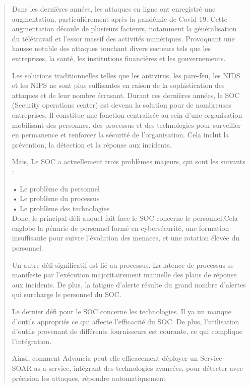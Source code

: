 \documentclass[
]{article}
\begin{document}
\begin{quote}
Dans les dernières années, les attaques en ligne ont enregistré une
augmentation, particulièrement après la pandémie de Covid-19. Cette
augmentation découle de plusieurs facteurs, notamment la généralisation
du télétravail et l'essor massif des activités numériques. Provoquant
une hausse notable des attaques touchant divers secteurs tels que les
entreprises, la santé, les institutions financières et les
gouvernements.

Les solutions traditionnelles telles que les antivirus, les pare-feu,
les NIDS et les NIPS ne sont plus suffisantes en raison de la
sophistication des attaques et de leur nombre écrasant. Durant ces
dernières années, le SOC (Security operations center) est devenu la
solution pour de nombreuses entreprises. Il constitue une fonction
centralisée au sein d'une organisation mobilisant des personnes, des
processus et des technologies pour surveiller en permanence et renforcer
la sécurité de l'organisation. Cela inclut la prévention, la détection
et la réponse aux incidents.

Mais, Le SOC a actuellement trois problèmes majeurs, qui sont les
suivants :

\emph{•} Le problème du personnel\\
\emph{•} Le problème du processus\\
\emph{•} Le problème des technologies\\
Donc, le principal défi auquel fait face le SOC concerne le
personnel.Cela englobe la pénurie de personnel formé en cybersécurité,
une formation insuffisante pour suivre l'évolution des menaces, et une
rotation élevée du personnel.

Un autre défi significatif est lié au processus. La latence de processus
se manifeste par l'exécution majoritairement manuelle des plans de
réponse aux incidents. De plus, la fatigue d'alerte résulte du grand
nombre d'alertes qui surcharge le personnel du SOC.

Le dernier défi pour le SOC concerne les technologies. Il ya un manque
d'outils appropriés ce qui affecte l'efficacité du SOC. De plus,
l'utilisation d'outils provenant de différents fournisseurs est
courante, ce qui complique l'intégration.

Ainsi, comment Advancia peut-elle efficacement déployer un Service
SOAR-as-a-service, intégrant des technologies avancées, pour détecter
avec précision les attaques, répondre automatiquement
\end{quote}
\end{document}
